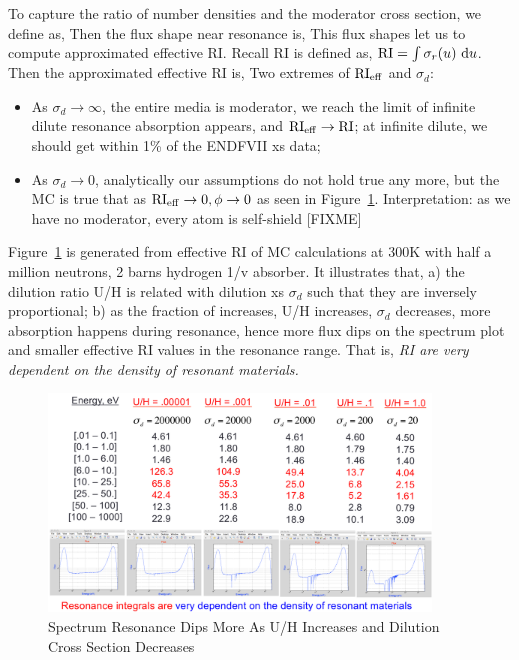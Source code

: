 \documentclass{school-22.211-notes}
\begin{document}
To capture the ratio of number densities and the moderator cross section, we define  as,
Then the flux shape near resonance is,
This flux shapes let us to compute approximated effective RI. Recall RI is defined as, $\mathrm{RI} = \int \sigma_r (u) \mbox{ }\mathrm{d} u$. Then the approximated effective RI is,
Two extremes of $\mathrm{RI}_{\mathrm{eff}}$ and $\sigma_d$:
\begin{itemize}
\item As $\sigma_d \to \infty$, the entire media is moderator, we reach the limit of infinite dilute resonance absorption appears, and $\mathrm{RI}_{\mathrm{eff}} \to \mathrm{RI}$; at infinite dilute, we should get within 1\% of the ENDFVII xs data;
\item As $\sigma_d \to 0$, analytically our assumptions do not hold true any more, but the MC is true that as $\mathrm{RI}_{\mathrm{eff}} \to 0, \phi \to 0$ as seen in Figure~\ref{dilution-factor-increase}. Interpretation: as we have no moderator, every atom is self-shield [FIXME]
\end{itemize}
Figure~\ref{dilution-factor-increase} is generated from effective RI of MC calculations at 300K with half a million neutrons, 2 barns hydrogen 1/v absorber. It illustrates that, a) the dilution ratio U/H is related with dilution xs $\sigma_d$ such that they are inversely proportional; b) as the fraction of  increases, U/H increases, $\sigma_d$ decreases, more absorption happens during resonance, hence more flux dips on the spectrum plot and smaller effective RI values in the resonance range. That is, \textit{RI are very dependent on the density of resonant materials.}
\begin{figure}
  \centering
  \includegraphics[width=4in]{images/dilution-factor-increase.png}
  \caption{Spectrum Resonance Dips More As U/H Increases and Dilution Cross Section Decreases} \label{dilution-factor-increase}
\end{figure}
\end{document}
